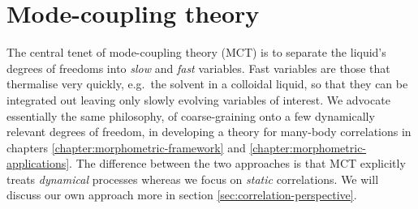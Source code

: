 \documentclass[11pt,twoside]{report}
\begin{document}




\section{Mode-coupling theory}
\label{sec:mct}

The central tenet of mode-coupling theory (MCT) is to separate the liquid's degrees of freedoms into \emph{slow} and \emph{fast} variables.
Fast variables are those that thermalise very quickly, e.g.\ the solvent in a colloidal liquid, so that they can be integrated out leaving only slowly evolving variables of interest.
We advocate essentially the same philosophy, of coarse-graining onto a few dynamically relevant degrees of freedom, in developing a theory for many-body correlations in chapters \ref{chapter:morphometric-framework} and \ref{chapter:morphometric-applications}.
The difference between the two approaches is that MCT explicitly treats \emph{dynamical} processes whereas we focus on \emph{static} correlations.
We will discuss our own approach more in section \ref{sec:correlation-perspective}.
\end{document}

